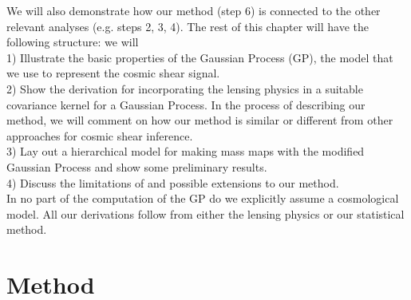 We will also demonstrate how our method
(step 6) is connected to the other relevant analyses (e.g. steps 2, 3, 4). 
The rest of this chapter will have the following structure: we will \\ 
1) Illustrate the basic properties of the Gaussian Process (GP), the model that we
use to represent the cosmic shear signal.\\ 
2) Show the derivation for incorporating the lensing physics in 
a suitable covariance kernel for a Gaussian Process.
In the process of describing our method, we will comment on how our method is  
similar or different from other approaches for cosmic shear inference.\\
3) Lay out a hierarchical model for making mass maps 
with the modified Gaussian Process and show some preliminary results.\\ 
4) Discuss the limitations of and possible extensions to our method.\\
In no part of the computation of the GP do we explicitly assume a cosmological model. All our
derivations follow from either the lensing physics or our statistical method.   


\section{Method}


